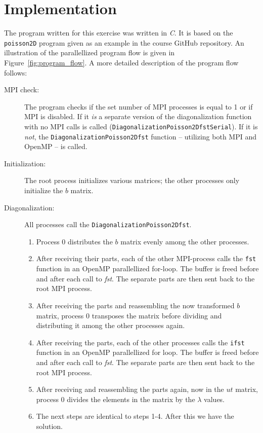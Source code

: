 
\section{Implementation} %
\label{sec:implementation}
The program written for this exercise was written in \emph{C}. It is based on the \texttt{poisson2D} program given as an example in the course GitHub repository. An illustration of the parallellized program flow is given in Figure~\ref{fig:program_flow}. A more detailed description of the program flow follows:
\begin{description}
  \item [MPI check:] The program checks if the set number of MPI processes is equal to 1 or if MPI is disabled. If it \emph{is} a separate version of the diagonalization function with no MPI calls is called (\texttt{DiagonalizationPoisson2DfstSerial}). If it is \emph{not}, the \texttt{DiagonalizationPoisson2Dfst} function -- utilizing both MPI and OpenMP -- is called.
  \item [Initialization:] The root process initializes various matrices; the other processes only initialize the $b$ matrix.
  \item [Diagonalization:] All processes call the \texttt{DiagonalizationPoisson2Dfst}.
  \begin{enumerate}
    \item Process 0 distributes the $b$ matrix evenly among the other processes.
    \item After receiving their parts, each of the other MPI-process calls the \texttt{fst} function in an OpenMP parallellized for-loop. The buffer is freed before and after each call to \emph{fst}. The separate parts are then sent back to the root MPI process.
    \item After receiving the parts and reassembling the now transformed $b$ matrix, process 0 transposes the matrix before dividing and distributing it among the other processes again.
    \item After receiving the parts, each of the other processes calls the \texttt{ifst} function in an OpenMP parallellized for loop. The buffer is freed before and after each call to \emph{fst}. The separate parts are then sent back to the root MPI process.
    \item After receiving and reassembling the parts again, now in the $ut$ matrix, process 0 divides the elements in the matrix by the $\lambda$ values.
    \item The next steps are identical to steps 1-4. After this we have the solution.
  \end{enumerate}
\end{description}

